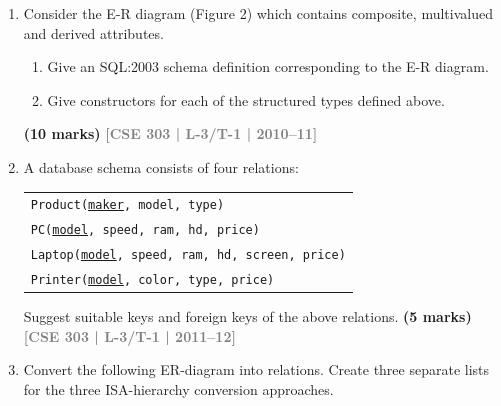 \documentclass[12pt,a3paper]{article}
\newcommand{\yr}[1]{\hfill\textcolor{gray}{\small\textbf{[#1]}}}
\newcommand{\mk}[1]{\textcolor{orange!70!black}{\small\textbf{(#1 marks)}}}
\begin{document}
\begin{enumerate}

\item Consider the E-R diagram (Figure 2) which contains composite, multivalued and derived attributes.
\begin{enumerate}
  \item Give an SQL:2003 schema definition corresponding to the E-R diagram.
  \item Give constructors for each of the structured types defined above.
\end{enumerate}
\mk{10} \yr{CSE 303 | L-3/T-1 | 2010--11}

\item A database schema consists of four relations:
\begin{center}
\begin{tabular}{l}
\texttt{Product(\underline{maker}, model, type)}\\
\texttt{PC(\underline{model}, speed, ram, hd, price)}\\
\texttt{Laptop(\underline{model}, speed, ram, hd, screen, price)}\\
\texttt{Printer(\underline{model}, color, type, price)}
\end{tabular}
\end{center}
Suggest suitable keys and foreign keys of the above relations.
\mk{5} \yr{CSE 303 | L-3/T-1 | 2011--12}

\item Convert the following ER-diagram into relations. Create three separate lists for the three ISA-hierarchy conversion approaches.

\begin{center}
\end{center}
\end{enumerate}
\end{document}

